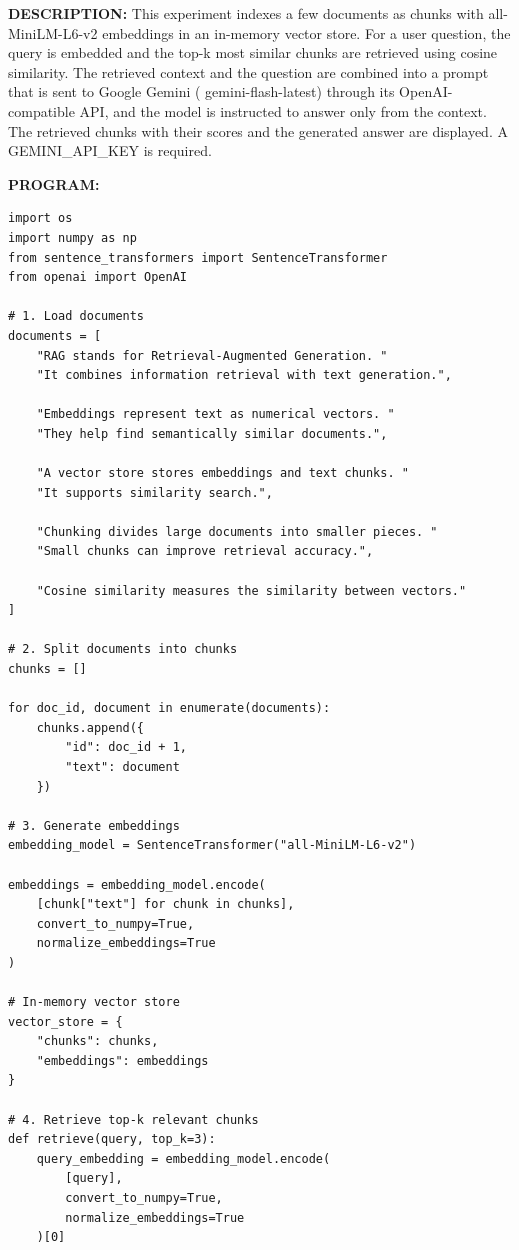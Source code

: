 \documentclass[10pt,a4paper]{article}
\newcommand{\code}[1]{{\ttfamily\hyphenchar\font=-1 #1}}
\newcommand{\sectionlabel}[1]{\par\vspace{3pt}\noindent\textbf{#1}\par\nopagebreak}
\begin{document}
\noindent\textbf{DESCRIPTION:} This experiment indexes a few documents as chunks with \code{all{-}\allowbreak{}MiniLM{-}\allowbreak{}L6{-}\allowbreak{}v2} embeddings in an in-memory vector store. For a user question, the query is embedded and the top-k most similar chunks are retrieved using cosine similarity. The retrieved context and the question are combined into a prompt that is sent to Google Gemini (\code{gemini{-}\allowbreak{}flash{-}\allowbreak{}latest}) through its OpenAI-compatible API, and the model is instructed to answer only from the context. The retrieved chunks with their scores and the generated answer are displayed. A \code{GEMINI\_\allowbreak{}API\_\allowbreak{}KEY} is required.

\sectionlabel{PROGRAM:}
\begin{lstlisting}[style=code]
import os
import numpy as np
from sentence_transformers import SentenceTransformer
from openai import OpenAI

# 1. Load documents
documents = [
    "RAG stands for Retrieval-Augmented Generation. "
    "It combines information retrieval with text generation.",

    "Embeddings represent text as numerical vectors. "
    "They help find semantically similar documents.",

    "A vector store stores embeddings and text chunks. "
    "It supports similarity search.",

    "Chunking divides large documents into smaller pieces. "
    "Small chunks can improve retrieval accuracy.",

    "Cosine similarity measures the similarity between vectors."
]

# 2. Split documents into chunks
chunks = []

for doc_id, document in enumerate(documents):
    chunks.append({
        "id": doc_id + 1,
        "text": document
    })

# 3. Generate embeddings
embedding_model = SentenceTransformer("all-MiniLM-L6-v2")

embeddings = embedding_model.encode(
    [chunk["text"] for chunk in chunks],
    convert_to_numpy=True,
    normalize_embeddings=True
)

# In-memory vector store
vector_store = {
    "chunks": chunks,
    "embeddings": embeddings
}

# 4. Retrieve top-k relevant chunks
def retrieve(query, top_k=3):
    query_embedding = embedding_model.encode(
        [query],
        convert_to_numpy=True,
        normalize_embeddings=True
    )[0]


\end{lstlisting}
\end{document}
